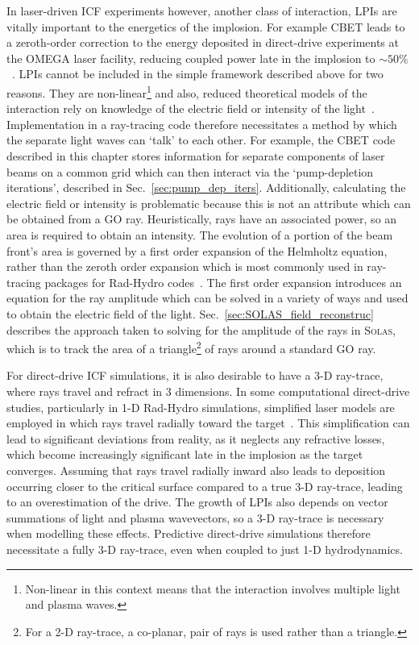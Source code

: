 In laser-driven \ac{ICF} experiments however, another class of interaction, \ac{LPIs} are vitally important to the energetics of the implosion.
For example \ac{CBET} leads to a zeroth-order correction to the energy deposited in direct-drive experiments at the OMEGA laser facility, reducing coupled power late in the implosion to $\sim 50\%$~\cite{colaitis_inverse_2021}.
\ac{LPIs} cannot be included in the simple framework described above for two reasons.
They are non-linear\footnote{Non-linear in this context means that the interaction involves multiple light and plasma waves.} and also, reduced theoretical models of the interaction rely on knowledge of the electric field or intensity of the light~\cite{randall_theory_1981}.
Implementation in a ray-tracing code therefore necessitates a method by which the separate light waves can `talk' to each other.
For example, the \ac{CBET} code described in this chapter stores information for separate components of laser beams on a common grid which can then interact via the `pump-depletion iterations', described in Sec.~\ref{sec:pump_dep_iters}.
Additionally, calculating the electric field or intensity is problematic because this is not an attribute which can be obtained from a \ac{GO} ray.
Heuristically, rays have an associated power, so an area is required to obtain an intensity.
The evolution of a portion of the beam front's area is governed by a first order expansion of the Helmholtz equation, rather than the zeroth order expansion which is most commonly used in ray-tracing packages for \ac{Rad-Hydro} codes~\cite{colaitis_towards_2014}.
The first order expansion introduces an equation for the ray amplitude which can be solved in a variety of ways and used to obtain the electric field of the light.
Sec.~\ref{sec:SOLAS_field_reconstruc} describes the approach taken to solving for the amplitude of the rays in \textsc{Solas}, which is to track the area of a triangle\footnote{For a 2-D ray-trace, a co-planar, pair of rays is used rather than a triangle.} of rays around a standard \ac{GO} ray.

For direct-drive \ac{ICF} simulations, it is also desirable to have a 3-D ray-trace, where rays travel and refract in 3 dimensions.
In some computational direct-drive studies, particularly in 1-D \ac{Rad-Hydro} simulations, simplified laser models are employed in which rays travel radially toward the target~\cite{paddock_one-dimensional_2021}.
This simplification can lead to significant deviations from reality, as it neglects any refractive losses, which become increasingly significant late in the implosion as the target converges.
Assuming that rays travel radially inward also leads to deposition occurring closer to the critical surface compared to a true 3-D ray-trace, leading to an overestimation of the drive.
The growth of \ac{LPIs} also depends on vector summations of light and plasma wavevectors, so a 3-D ray-trace is necessary when modelling these effects.
Predictive direct-drive simulations therefore necessitate a fully 3-D ray-trace, even when coupled to just 1-D hydrodynamics.



